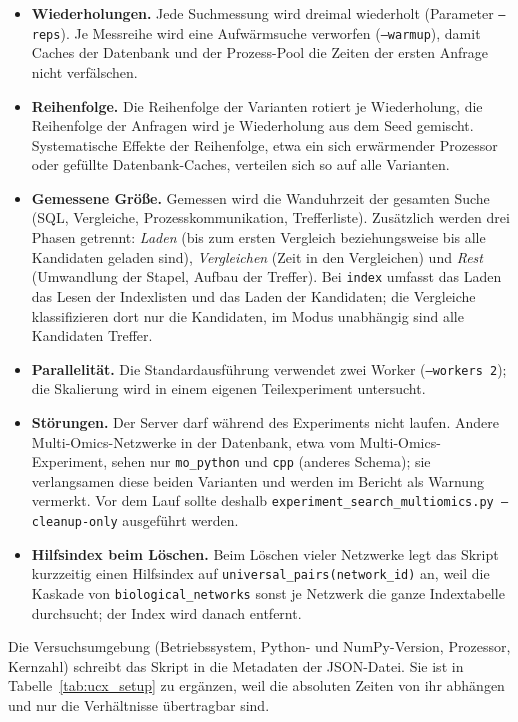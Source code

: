 \begin{itemize}
	\item \textbf{Wiederholungen.} Jede Suchmessung wird dreimal wiederholt (Parameter \texttt{--reps}). Je Messreihe wird eine Aufwärmsuche verworfen (\texttt{--warmup}), damit Caches der Datenbank und der Prozess-Pool die Zeiten der ersten Anfrage nicht verfälschen.
	\item \textbf{Reihenfolge.} Die Reihenfolge der Varianten rotiert je Wiederholung, die Reihenfolge der Anfragen wird je Wiederholung aus dem Seed gemischt. Systematische Effekte der Reihenfolge, etwa ein sich erwärmender Prozessor oder gefüllte Datenbank-Caches, verteilen sich so auf alle Varianten.
	\item \textbf{Gemessene Größe.} Gemessen wird die Wanduhrzeit der gesamten Suche (SQL, Vergleiche, Prozesskommunikation, Trefferliste). Zusätzlich werden drei Phasen getrennt: \emph{Laden} (bis zum ersten Vergleich beziehungsweise bis alle Kandidaten geladen sind), \emph{Vergleichen} (Zeit in den Vergleichen) und \emph{Rest} (Umwandlung der Stapel, Aufbau der Treffer). Bei \texttt{index} umfasst das Laden das Lesen der Indexlisten und das Laden der Kandidaten; die Vergleiche klassifizieren dort nur die Kandidaten, im Modus unabhängig sind alle Kandidaten Treffer.
	\item \textbf{Parallelität.} Die Standardausführung verwendet zwei Worker (\texttt{--workers 2}); die Skalierung wird in einem eigenen Teilexperiment untersucht.
	\item \textbf{Störungen.} Der Server darf während des Experiments nicht laufen. Andere Multi-Omics-Netzwerke in der Datenbank, etwa vom Multi-Omics-Experiment, sehen nur \texttt{mo\_python} und \texttt{cpp} (anderes Schema); sie verlangsamen diese beiden Varianten und werden im Bericht als Warnung vermerkt. Vor dem Lauf sollte deshalb \texttt{experiment\_search\_multiomics.py --cleanup-only} ausgeführt werden.
	\item \textbf{Hilfsindex beim Löschen.} Beim Löschen vieler Netzwerke legt das Skript kurzzeitig einen Hilfsindex auf \texttt{universal\_pairs(network\_id)} an, weil die Kaskade von \texttt{biological\_networks} sonst je Netzwerk die ganze Indextabelle durchsucht; der Index wird danach entfernt.
\end{itemize}

Die Versuchsumgebung (Betriebssystem, Python- und NumPy-Version, Prozessor, Kernzahl) schreibt das Skript in die Metadaten der JSON-Datei. Sie ist in Tabelle~\ref{tab:ucx_setup} zu ergänzen, weil die absoluten Zeiten von ihr abhängen und nur die Verhältnisse übertragbar sind.

